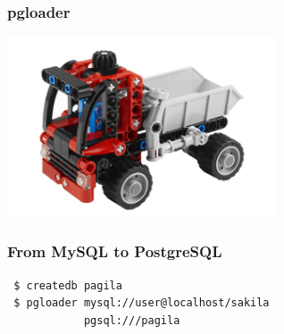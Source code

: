\documentclass{beamer}
\begin{document}
\begin{frame}
  \frametitle{pgloader}

  
  \begin{center}
    \includegraphics[height=2.1in]{pgloader.jpg}
  \end{center}
\end{frame}

\begin{frame}[fragile]
  \frametitle{From MySQL to PostgreSQL}

  \vfill

\begin{verbatim}
 $ createdb pagila
 $ pgloader mysql://user@localhost/sakila
            pgsql:///pagila
\end{verbatim}
\end{frame}
\end{document}
